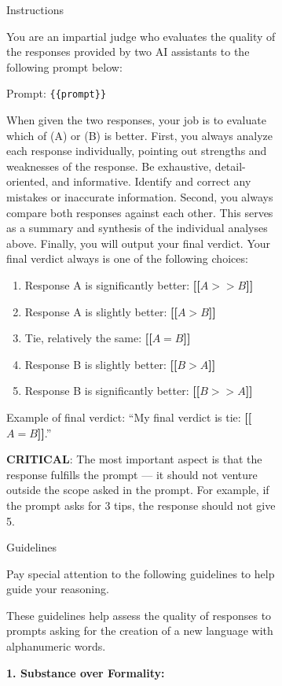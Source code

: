 \begin{figure}[h]
\begin{subfigure}{\linewidth}
\begin{tcolorbox}[colback=blue!5!white,colframe=mybrown!75!black]
\begin{scriptsize}
{\small Instructions}

You are an impartial judge who evaluates the quality of the responses provided by two AI assistants to the following prompt below:

Prompt: \texttt{\{\{prompt\}\}}

When given the two responses, your job is to evaluate which of (A) or (B) is better. First, you always analyze each response individually, pointing out strengths and weaknesses of the response. Be exhaustive, detail-oriented, and informative. Identify and correct any mistakes or inaccurate information. Second, you always compare both responses against each other. This serves as a summary and synthesis of the individual analyses above. Finally, you will output your final verdict. Your final verdict always is one of the following choices:

\begin{enumerate}
    \item Response A is significantly better: \textbf{[[$A>>B$]]}
    \item Response A is slightly better: \textbf{[[$A>B$]]}
    \item Tie, relatively the same: \textbf{[[$A=B$]]}
    \item Response B is slightly better: \textbf{[[$B>A$]]}
    \item Response B is significantly better: \textbf{[[$B>>A$]]}
\end{enumerate}

Example of final verdict: ``My final verdict is tie: \textbf{[[$A=B$]]}.''

\textbf{CRITICAL}: The most important aspect is that the response fulfills the prompt — it should not venture outside the scope asked in the prompt. For example, if the prompt asks for 3 tips, the response should not give 5.

{\small Guidelines}

Pay special attention to the following guidelines to help guide your reasoning.

These guidelines help assess the quality of responses to prompts asking for the creation of a new language with alphanumeric words. 

\textbf{1. Substance over Formality:}


\end{scriptsize}
\end{tcolorbox}
\end{subfigure}
\end{figure}
